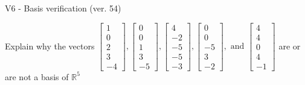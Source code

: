 \begin{exercise}
  \begin{exerciseTitle}V6 - Basis verification (ver. 54)\end{exerciseTitle}
  \begin{exerciseStatement}
    Explain why the vectors \(\left[\begin{array}{r}
1 \\
0 \\
2 \\
3 \\
-4
\end{array}\right] , \left[\begin{array}{r}
0 \\
0 \\
1 \\
3 \\
-5
\end{array}\right] , \left[\begin{array}{r}
4 \\
-2 \\
-5 \\
-5 \\
-3
\end{array}\right] , \left[\begin{array}{r}
0 \\
0 \\
-5 \\
3 \\
-2
\end{array}\right] , \text{ and } \left[\begin{array}{r}
4 \\
4 \\
0 \\
4 \\
-1
\end{array}\right]\) are or are not a basis of \(\mathbb{R}^5\)	



\end{exerciseStatement}
\end{exercise}
